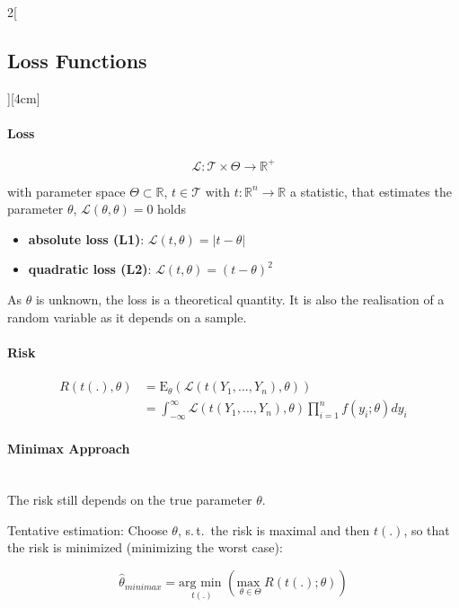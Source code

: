 \documentclass[8pt]{extarticle}
\begin{document}
\begin{multicols}{2}[\subsection{Loss Functions}][4cm]

\paragraph{Loss}

$$\mathcal{L}: \mathcal{T} \times \Theta \rightarrow \mathbb{R}^+$$

\noindent with parameter space $\Theta \subset \mathbb{R}$, $t\in \mathcal{T}$ with $t:\mathbb{R}^n \rightarrow \mathbb{R}$ a statistic, that estimates the parameter $\theta$,
 $\mathcal{L}(\theta, \theta) = 0$ holds

\begin{itemize}
\item \textbf{absolute loss (L1)}: $\mathcal{L}(t, \theta) = \left|t-\theta \right|$
\item \textbf{quadratic loss (L2)}: $\mathcal{L}(t, \theta) = (t-\theta)^2$
\end{itemize}

\noindent As $\theta$ is unknown, the loss is a theoretical quantity. It is also the realisation of a random variable as it depends on a sample.

\paragraph{Risk}

\begin{align*}
R(t(.), \theta) &= \mathrm{E}_\theta \left(\mathcal{L}(t(Y_1,...,Y_n),\theta)\right) \\
&= \int_{-\infty}^\infty \mathcal{L}(t(Y_1,...,Y_n),\theta) \prod_{i=1}^n f(y_i;\theta)dy_i
\end{align*}

\paragraph{Minimax Approach} \ \\
\noindent The risk still depends on the true parameter $\theta$.

\noindent Tentative estimation: Choose $\theta$, s.\,t.\ the risk is maximal and then $t(.)$, so that the risk is minimized (minimizing the worst case):

$$\hat{\theta}_{minimax} = \underset{t(.)}{\text{arg min }} \left(\underset{\theta \in \Theta}{\text{max }} R(t(.);\theta)\right)$$



\end{multicols}
\end{document}
